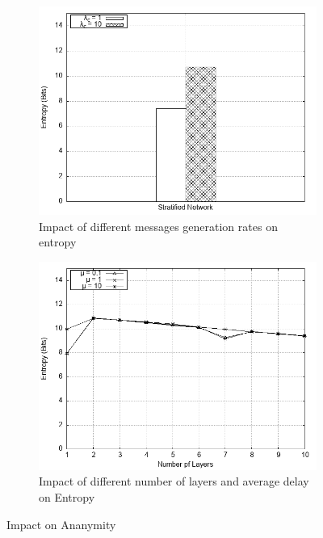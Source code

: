 \documentclass[logo,msc,cyber]{infthesis}   %
\begin{document}
\begin{figure}[h!]
    \centering
    \begin{subfigure}[b]{0.45\textwidth}
        \centering
        \includegraphics[width=\textwidth]{figures/mixim/2.png}
        \caption{Impact of different messages generation rates on entropy}
        \label{fig:mixim-different-generation}
    \end{subfigure}
    \hfill
    \begin{subfigure}[b]{0.45\textwidth}
        \centering
        \includegraphics[width=\textwidth]{figures/mixim/3.png}
        \caption{Impact of different number of layers and average delay on Entropy}
        \label{fig:mixim-different-layers}
    \end{subfigure}
    \caption{Impact on Ananymity}
 \end{figure}
\end{document}
